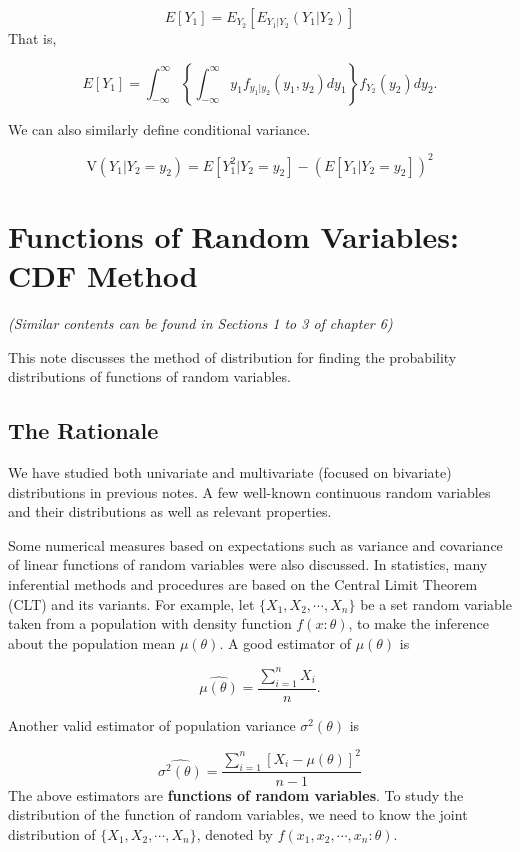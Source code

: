 \documentclass[
]{book}
\begin{document}
\[
E[Y_1] = E_{Y_2}[E_{Y_1|Y_2}(Y_1|Y_2)]
\]
That is,

\[
E[Y_1] = \int_{-\infty}^\infty \left\{ \int_{-\infty}^\infty y_1f_{y_1|y_2}(y_1, y_2)dy_1\right\}f_{Y_2}(y_2)dy_2.
\]

We can also similarly define conditional variance.

\[
\text{V}(Y_1|Y_2 = y_2) = E[Y_1^2|Y_2 = y_2] - \left(E[Y_1|Y_2 = y_2] \right)^2
\]

\hypertarget{functions-of-random-variables-cdf-method}{%
\chapter{Functions of Random Variables: CDF Method}\label{functions-of-random-variables-cdf-method}}

\emph{(Similar contents can be found in Sections 1 to 3 of chapter 6)}

This note discusses the method of distribution for finding the probability distributions of functions of random variables.

\hfill\break

\hypertarget{the-rationale}{%
\section{The Rationale}\label{the-rationale}}

We have studied both univariate and multivariate (focused on bivariate) distributions in previous notes. A few well-known continuous random variables and their distributions as well as relevant properties.

Some numerical measures based on expectations such as variance and covariance of linear functions of random variables were also discussed. In statistics, many inferential methods and procedures are based on the Central Limit Theorem (CLT) and its variants. For example, let \(\{X_1, X_2, \cdots, X_n \}\) be a set random variable taken from a population with density function \(f(x:\theta)\), to make the inference about the population mean \(\mu(\theta)\). A good estimator of \(\mu(\theta)\) is

\[
\widehat{\mu(\theta)} = \frac{\sum_{i=1}^n X_i}{n}. 
\]

Another valid estimator of population variance \(\sigma^2(\theta)\) is

\[
\widehat{\sigma^2(\theta)} = \frac{\sum_{i=1}^n [X_i-\mu(\theta)]^2}{n-1}
\]
The above estimators are \textbf{functions of random variables}. To study the distribution of the function of random variables, we need to know the joint distribution of \(\{X_1, X_2, \cdots, X_n \}\), denoted by \(f(x_1, x_2, \cdots, x_n:\theta)\).
\end{document}
